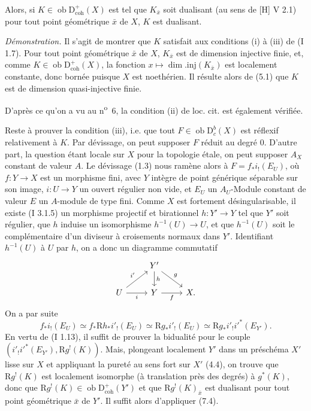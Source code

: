 \documentclass[11pt]{article}
\newcommand{\R}{\mathrm{R}}
\newcommand{\D}{\mathrm{D}}
\newcommand{\ob}{\operatorname{ob}}
\providecommand{\ob}{\operatorname{ob}}
\providecommand{\R}{\mathrm R}
\begin{document}
Alors, si $K\in\ob\D^{+}_{\mathrm{coh}}(X)$ est tel que $K_{\bar{x}}$ soit dualisant (au sens de [H] V 2.1) pour tout point géométrique $\bar{x}$ de $X$, $K$ est dualisant.

\emph{Démonstration.} Il s'agit de montrer que $K$ satisfait aux conditions (i) à (iii) de (I 1.7). Pour tout point géométrique $\bar{x}$ de $X$, $K_{\bar{x}}$ est de dimension injective finie, et, comme $K\in\ob\D^{+}_{\mathrm{coh}}(X)$, la fonction $x\mapsto \dim.\mathrm{inj}(K_{\bar{x}})$ est localement constante, donc bornée puisque $X$ est noethérien. Il résulte alors de (5.1) que $K$ est de dimension quasi-injective finie.

D'après ce qu'on a vu au n\textsuperscript{o}~6, la condition (ii) de loc. cit. est également vérifiée.

Reste à prouver la condition (iii), i.e. que tout $F\in\ob\D_c^b(X)$ est réflexif relativement à $K$. Par dévissage, on peut supposer $F$ réduit au degré $0$. D'autre part, la question étant locale sur $X$ pour la topologie étale, on peut supposer $A_X$ constant de valeur $A$. Le dévissage (1.3) nous ramène alors à $F=f_*i_!(E_U)$, où $f:Y\to X$ est un morphisme fini, avec $Y$ intègre de point générique séparable sur son image, $i:U\to Y$ un ouvert régulier non vide, et $E_U$ un $A_U$-Module constant de valeur $E$ un $A$-module de type fini. Comme $X$ est fortement désingularisable, il existe (I 3.1.5) un morphisme projectif et birationnel $h:Y'\to Y$ tel que $Y'$ soit régulier, que $h$ induise un isomorphisme $h^{-1}(U)\to U$, et que $h^{-1}(U)$ soit le complémentaire d'un diviseur à croisements normaux dans $Y'$. Identifiant $h^{-1}(U)$ à $U$ par $h$, on a donc un diagramme commutatif
\[
\begin{tikzcd}
& Y' \arrow[d,"h"] \arrow[dr,"g"] & \\
U \arrow[ur,"i'"] \arrow[r,"i"'] & Y \arrow[r,"f"'] & X.
\end{tikzcd}
\]
On a par suite
\[
        f_*i_!(E_U)\simeq f_*\R h_* i'_!(E_U)\simeq \R g_* i'_!(E_U)\simeq \R g_* i'_! i'^*(E_{Y'}).
\]
En vertu de (I 1.13), il suffit de prouver la bidualité pour le couple $(i'_!i'^*(E_{Y'}),\R g^!(K))$. Mais, plongeant localement $Y'$ dans un préschéma $X'$ lisse sur $X$ et appliquant la pureté au sens fort sur $X'$ (4.4), on trouve que $\R g^!(K)$ est localement isomorphe (à translation près des degrés) à $g^*(K)$, donc que $\R g^!(K)\in\ob\D^{+}_{\mathrm{coh}}(Y')$ et que $\R g^!(K)_{\bar{x}}$ est dualisant pour tout point géométrique $\bar{x}$ de $Y'$. Il suffit alors d'appliquer (7.4).
\end{document}
